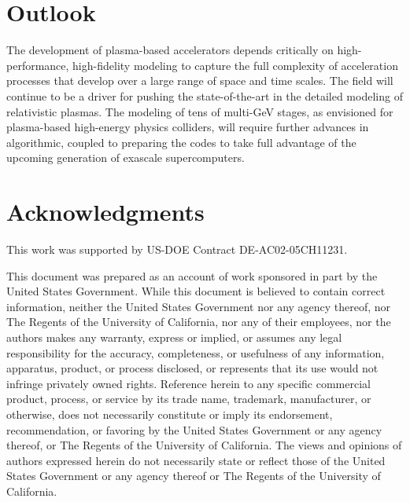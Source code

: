 \documentclass[]{report}
\begin{document}
\section{Outlook}

The development of plasma-based accelerators depends critically on high-performance, high-fidelity modeling to capture the full complexity of acceleration processes that develop over a large range of space and time scales. The field will continue to be a driver for pushing the state-of-the-art in the detailed modeling of relativistic plasmas. The modeling of tens of multi-GeV stages, as envisioned for plasma-based high-energy physics colliders, will require further advances in algorithmic, coupled to preparing the codes to take full advantage of the upcoming generation of exascale supercomputers. 

\section{Acknowledgments}

This work was supported by US-DOE Contract DE-AC02-05CH11231. 

This document was prepared as an account of work sponsored in part
by the United States Government. While this document is believed to
contain correct information, neither the United States Government
nor any agency thereof, nor The Regents of the University of California,
nor any of their employees, nor the authors makes any warranty, express
or implied, or assumes any legal responsibility for the accuracy,
completeness, or usefulness of any information, apparatus, product,
or process disclosed, or represents that its use would not infringe
privately owned rights. Reference herein to any specific commercial
product, process, or service by its trade name, trademark, manufacturer,
or otherwise, does not necessarily constitute or imply its endorsement,
recommendation, or favoring by the United States Government or any
agency thereof, or The Regents of the University of California. The
views and opinions of authors expressed herein do not necessarily
state or reflect those of the United States Government or any agency
thereof or The Regents of the University of California.\clearpage{}




\end{document}
